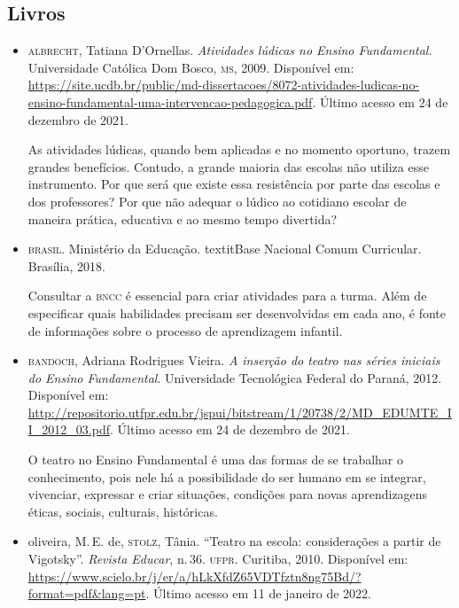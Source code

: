 \documentclass[11pt]{extarticle}
\begin{document}
\subsection{Livros}

\begin{itemize}

	\item \textsc{albrecht}, Tatiana D'Ornellas. \textit{Atividades lúdicas no Ensino Fundamental}. Universidade Católica Dom Bosco, \textsc{ms}, 2009. Disponível em: \url{https://site.ucdb.br/public/md-dissertacoes/8072-atividades-ludicas-no-ensino-fundamental-uma-intervencao-pedagogica.pdf}. Último acesso em 24 de dezembro de 2021.

	As atividades lúdicas, quando bem aplicadas e no momento oportuno, trazem
grandes benefícios. Contudo, a grande maioria das escolas não utiliza esse instrumento. Por
que será que existe essa resistência por parte das escolas e dos professores? Por que não
adequar o lúdico ao cotidiano escolar de maneira prática, educativa e ao mesmo tempo
divertida?

\item \textsc{brasil}. Ministério da Educação. textit{Base Nacional Comum Curricular}. Brasília, 2018.

Consultar a \textsc{bncc} é essencial para criar atividades para a turma. Além de especificar 
quais habilidades precisam ser desenvolvidas em cada ano, é fonte de informações sobre 
o processo de aprendizagem infantil. 

 \item \textsc{bandoch}, Adriana Rodrigues Vieira. \textit{A inserção do teatro nas séries iniciais do Ensino Fundamental}.
 Universidade Tecnológica Federal do Paraná, 2012. Disponível em: \url{http://repositorio.utfpr.edu.br/jspui/bitstream/1/20738/2/MD_EDUMTE_II_2012_03.pdf}. Último acesso em 24 de dezembro de 2021.

	O teatro no Ensino Fundamental é uma das formas de se trabalhar o conhecimento,
pois nele há a possibilidade do ser humano em se integrar, vivenciar, expressar e
criar situações, condições para novas aprendizagens éticas, sociais, culturais,
históricas.

\item {oliveira}, M.\,E. de, \textsc{stolz}, Tânia. ``Teatro na escola: considerações a partir de Vigotsky''. \textit{Revista Educar}, n.\,36. \textsc{ufpr}. Curitiba, 2010. Disponível em: \url{https://www.scielo.br/j/er/a/hLkXfdZ65VDTfztn8ng75Bd/?format=pdf&lang=pt}. Último acesso em 11 de janeiro de 2022.


\end{itemize}
\end{document}
